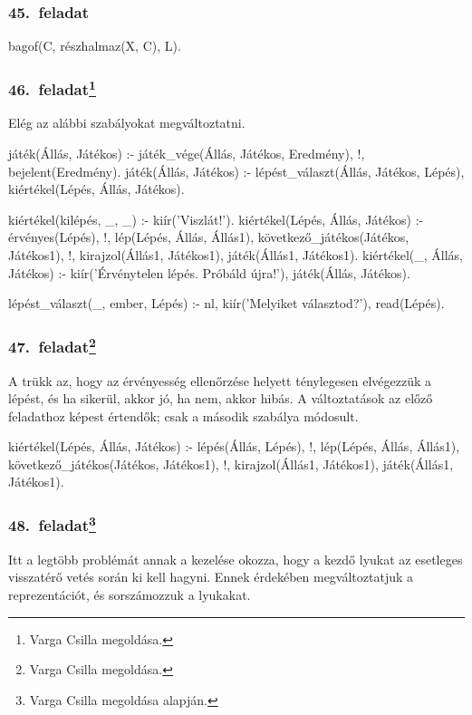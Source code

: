 \subsubsection*{45.~feladat}
\begin{program}
bagof(C, részhalmaz(X, C), L).
\end{program}
\subsubsection*{46.~feladat\footnote{Varga Csilla megoldása.}}
Elég az alábbi szabályokat megváltoztatni.
\begin{program}
játék(Állás, Játékos) :-
    játék_vége(Állás, Játékos, Eredmény), !,
    bejelent(Eredmény).
játék(Állás, Játékos) :-
    lépést_választ(Állás, Játékos, Lépés),
    kiértékel(Lépés, Állás, Játékos).

kiértékel(kilépés, _, _) :-
    kiír('Viszlát!').
kiértékel(Lépés, Állás, Játékos) :-
    érvényes(Lépés), !,
    lép(Lépés, Állás, Állás1),
    következő_játékos(Játékos, Játékos1), !,
    kirajzol(Állás1, Játékos1),
    játék(Állás1, Játékos1).
kiértékel(_, Állás, Játékos) :-
    kiír('Érvénytelen lépés. Próbáld újra!'),
    játék(Állás, Játékos).

lépést_választ(_, ember, Lépés) :-
    nl, kiír('Melyiket választod?'),
    read(Lépés).
\end{program}
\subsubsection*{47.~feladat\footnote{Varga Csilla megoldása.}}
A trükk az, hogy az érvényesség ellenőrzése helyett
ténylegesen elvégezzük a lépést, és ha sikerül,
akkor jó, ha nem, akkor hibás.
A változtatások az előző feladathoz képest
értendők; csak a  második szabálya
módosult.
\begin{program}
kiértékel(Lépés, Állás, Játékos) :-
    lépés(Állás, Lépés), !,
    lép(Lépés, Állás, Állás1), 
    következő_játékos(Játékos, Játékos1), !,
    kirajzol(Állás1, Játékos1),
    játék(Állás1, Játékos1).
\end{program}
\subsubsection*{48.~feladat\footnote{Varga Csilla megoldása alapján.}}
Itt a legtöbb problémát annak a kezelése okozza,
hogy a kezdő lyukat az esetleges visszatérő vetés
során ki kell hagyni. Ennek érdekében megváltoztatjuk
a reprezentációt, és sorszámozzuk a lyukakat.


